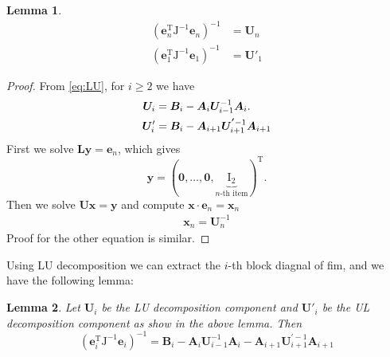 \documentclass[conference]{IEEEtran}
\newtheorem{lemma}{Lemma}
\begin{document}
\begin{lemma}
\begin{align}\label{eq:efim_pf}
(\bm{e}_n^{\textrm{T}}\bm{\mathrm{J}}^{-1}\bm{e}_n)^{-1}&=\bm{U}_n\nonumber\\
(\bm{e}_1^{\textrm{T}}\bm{\mathrm{J}}^{-1}\bm{e}_1)^{-1}&=\bm{U}'_1
\end{align}
\end{lemma}
\begin{proof}
From \eqref{eq:LU}, for $i \geq 2$ we have
\begin{align}\label{eq:efim_pf2}\notag
\bm{U}_i &= \bm{B}_i-\bm{A}_i\bm{U}_{i-1}^{-1}\bm{A}_i.\\
\bm{U}'_i &= \bm{B}_i-\bm{A}_{i+1}\bm{U}_{i+1}^{\bm{'}-1}\bm{A}_{i+1}
\end{align}
First we solve $\bm{L} \bm{y} = \bm{e}_n$, which gives
\begin{equation}
\bm{y}=(\bm{0},\dots,\bm{0},\underbrace{\bm{\mathrm{I}}_2}_{\text{$n$-th item}})^{\textrm{T}}.
\end{equation}
Then we solve $\bm{U} \bm{x} = \bm{y}$ and compute $\bm{x}\cdot \bm{e}_n=\bm{x}_n$
\begin{align}
\bm{x}_n=\bm{U}_n^{-1}
\end{align}
Proof for the other equation is similar.
\end{proof}
Using LU decomposition we can extract the $i$-th block diagnal of \ac{fim}, and we have the following lemma:
\begin{lemma}\label{lemma:2}
Let $\bm{U}_{i}$ be the LU decomposition component and $\bm{U}'_{i}$ be the UL decomposition component as show in the above lemma. Then
\begin{equation}
(\bm{e}_i^{\textrm{T}}\bm{\mathrm{J}}^{-1}\bm{e}_i)^{-1}=\bm{B}_i-\bm{A}_i \bm{U}_{i-1}^{-1} \bm{A}_i-\bm{A}_{i+1}\bm{U}_{i+1}^{'-1} \bm{A}_{i+1}
\end{equation}
\end{lemma}
\end{document}
